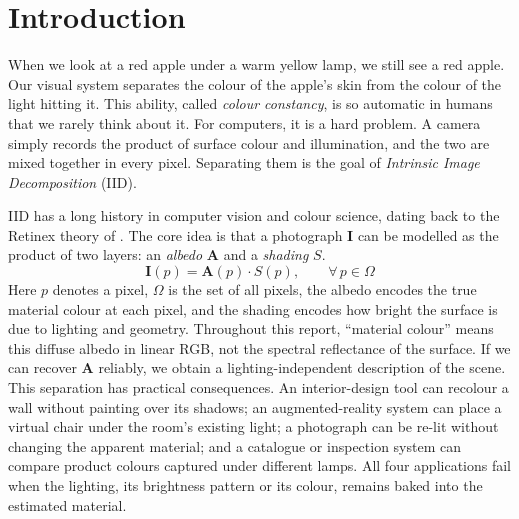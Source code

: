 \chapter{Introduction}
\label{ch:intro}


When we look at a red apple under a warm yellow lamp, we still see a red apple.
Our visual system separates the colour of the apple's skin from the colour of the
light hitting it.
This ability, called \emph{colour constancy}, is so automatic in humans that
we rarely think about it.
For computers, it is a hard problem.
A camera simply records the product of surface colour and illumination, and the two
are mixed together in every pixel.
Separating them is the goal of \emph{Intrinsic Image Decomposition} (IID).

IID has a long history in computer vision and colour science, dating back to the
Retinex theory of .
The core idea is that a photograph $\mathbf{I}$ can be modelled as the product of
two layers: an \emph{albedo} $\mathbf{A}$ and a \emph{shading} $S$.
\begin{equation}
  \mathbf{I}(p) = \mathbf{A}(p) \cdot S(p), \qquad \forall\, p \in \Omega
  \label{eq:iid_model}
\end{equation}
Here $p$ denotes a pixel, $\Omega$ is the set of all pixels, the albedo encodes
the true material colour at each pixel, and the shading encodes how bright the
surface is due to lighting and geometry.
Throughout this report, ``material colour'' means this diffuse albedo in linear RGB, not the
spectral reflectance of the surface.
If we can recover $\mathbf{A}$ reliably, we obtain a lighting-independent
description of the scene. This separation has practical consequences. An
interior-design tool can recolour a wall without painting over its shadows; an
augmented-reality system can place a virtual chair under the room's existing
light; a photograph can be re-lit without changing the apparent material; and a
catalogue or inspection system can compare product colours captured under
different lamps. All four applications fail when the lighting, its brightness
pattern or its colour, remains baked into the estimated material.

